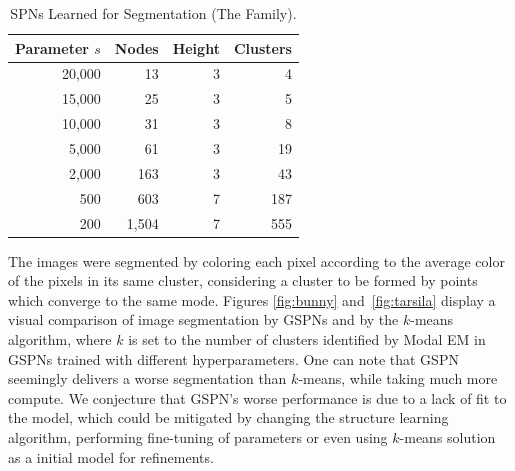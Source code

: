 \documentclass[accepted]{tpm2023} %
\begin{document}
\begin{table}
  \centering
  \caption{SPNs Learned for Segmentation (The Family).}
  \label{tab:segmentation-tarsila}

  \begin{tabular}{rrrr}
    \toprule
    \bfseries Parameter $s$ & \bfseries Nodes & \bfseries Height & \bfseries Clusters \\ \midrule
    20,000                  & 13              & 3                & 4                  \\
    15,000                  & 25              & 3                & 5                  \\
    10,000                  & 31              & 3                & 8                  \\
    5,000                   & 61              & 3                & 19                 \\
    2,000                   & 163             & 3                & 43                 \\
    500                     & 603             & 7                & 187                \\
    200                     & 1,504           & 7                & 555                \\
    \bottomrule
  \end{tabular}
\end{table}

\newcommand{\segfigrow}[3]{
  \begin{minipage}{0.1\textwidth}
    \centering
    $s = #2$\\$k = #3$
  \end{minipage}    &
  \begin{minipage}{0.12\textwidth}
    \centering
    \scalebox{0.29}{\texttt{[image: fixed\_mem\_recolored\_\#1\_200\_\#2\_0.300000.png]}}
  \end{minipage} &
  \begin{minipage}{0.12\textwidth}
    \centering
    \scalebox{0.29}{\texttt{[image: k\_\#3\_recolored\_\#1\_200.png]}}
  \end{minipage}
}

The images were segmented by coloring each pixel according to the average color of the pixels in its same cluster, considering a cluster to be formed by points which converge to the same mode.
Figures \ref{fig:bunny} and~\ref{fig:tarsila} display a visual comparison of image segmentation by GSPNs and by the $k$-means algorithm, where $k$ is set to the number of clusters identified by Modal EM in GSPNs trained with different hyperparameters.
One can note that GSPN seemingly delivers a worse segmentation than $k$-means, while taking much more compute.
We conjecture that GSPN's worse performance is due to a lack of fit to the model, which could be mitigated by changing the structure learning algorithm, performing fine-tuning of parameters or even using $k$-means solution as a initial model for refinements.
\end{document}

